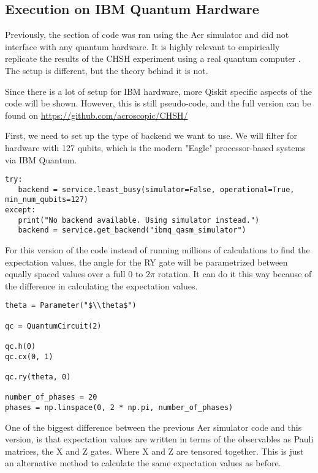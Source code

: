 \documentclass[12pt]{article}
\begin{document}
\newpage
\subsection{Execution on IBM Quantum Hardware}
Previously, the section of code was ran using the Aer simulator and did not interface with any quantum hardware. It is highly relevant to empirically replicate the results of the CHSH experiment using a real quantum computer \cite{ibm_quantum}. The setup is different, but the theory behind it is not. 

Since there is a lot of setup for IBM hardware, more Qiskit specific aspects of the code will be shown. However, this is still pseudo-code, and the full version can be found on \url{https://github.com/acroscopic/CHSH/}

First, we need to set up the type of backend we want to use. We will filter for hardware with 127 qubits, which is the modern "Eagle" processor-based systems via IBM Quantum. \cite{ibm_quantum}
\begin{lstlisting}[style=python]
try:
   backend = service.least_busy(simulator=False, operational=True, min_num_qubits=127)
except:
   print("No backend available. Using simulator instead.")
   backend = service.get_backend("ibmq_qasm_simulator")
\end{lstlisting}

For this version of the code instead of running millions of calculations to find the expectation values, the angle for the RY gate will be parametrized between equally spaced values over a full 0 to $2\pi$ rotation. It can do it this way because of the difference in calculating the expectation values. 

\begin{lstlisting}[style=python]
theta = Parameter("$\\theta$")

qc = QuantumCircuit(2)

qc.h(0)
qc.cx(0, 1)

qc.ry(theta, 0)

number_of_phases = 20
phases = np.linspace(0, 2 * np.pi, number_of_phases)
\end{lstlisting}

One of the biggest difference between the previous Aer simulator code and this version, is that expectation values are written in terms of the observables as Pauli matrices, the X and Z gates. Where X and Z are tensored together. This is just an alternative method to calculate the same expectation values as before.
\end{document}
